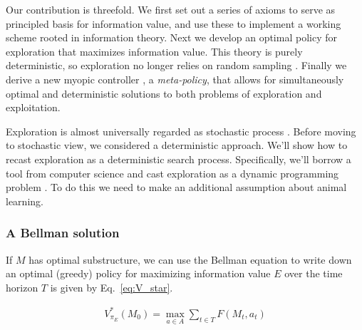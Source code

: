 \documentclass[9pt,twocolumn,twoside]{pnas-new}
\begin{document}
Our contribution is threefold. We first set out a series of axioms to serve as principled basis for information value, and use these to implement a working scheme rooted in information theory. Next we develop an optimal policy for exploration that maximizes information value. This theory is purely deterministic, so exploration no longer relies on random sampling \cite{Haarnojaa,Kakade2002,Pathak2017,Sutton1990,thrun1992active,dayan1996exploration}. Finally we derive a new myopic controller \cite{Hocker2017}, a \textit{meta-policy}, that allows for simultaneously optimal and deterministic solutions to both problems of exploration and exploitation. 



Exploration is almost universally regarded as stochastic process \cite{Sutton2018,Jaegle}. Before moving to stochastic view, we considered a deterministic approach. We'll show how to recast exploration as a deterministic search process. Specifically, we'll borrow a tool from computer science and cast exploration as a dynamic programming problem \cite{TODO}. To do this we need to make an additional assumption about animal learning.

\subsubsection*{A Bellman solution}
If $M$ has optimal substructure, we can use the Bellman equation \cite{Bellman} to write down an optimal (greedy) policy for maximizing information value $E$ over the time horizon $T$ is given by Eq.~\ref{eq:V_star}.

\begin{equation} \label{eq:V_star}
    \begin{split}
        V^*_{\pi_E}(M_0) = \max_{a \in A} \sum_{t \in T} F(M_t, a_t)
    \end{split}
\end{equation}
\end{document}

